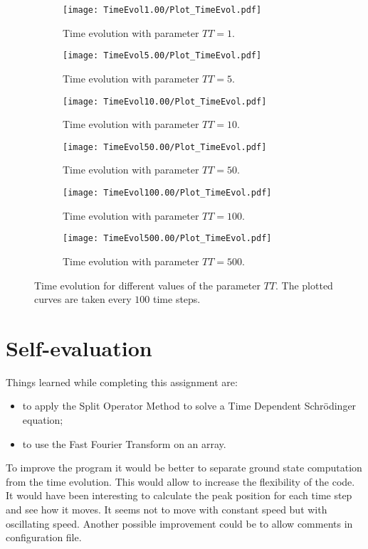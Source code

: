 \documentclass[11pt,a4paper]{article}
\begin{document}
\begin{figure}[t]
	\centering
	\begin{subfigure}{0.49\textwidth}
		\texttt{[image: TimeEvol1.00/Plot\_TimeEvol.pdf]}
		\caption{Time evolution with parameter $TT = 1$.}
		\label{fig:TE1}
	\end{subfigure}
	\hfill
	\begin{subfigure}{0.49\textwidth}
		\texttt{[image: TimeEvol5.00/Plot\_TimeEvol.pdf]}
		\caption{Time evolution with parameter $TT = 5$.}
		\label{fig:TE5}
	\end{subfigure}
	\begin{subfigure}{0.49\textwidth}
		\texttt{[image: TimeEvol10.00/Plot\_TimeEvol.pdf]}
		\caption{Time evolution with parameter $TT = 10$.}
		\label{fig:TE10}
	\end{subfigure}
	\hfill
	\begin{subfigure}{0.49\textwidth}
		\texttt{[image: TimeEvol50.00/Plot\_TimeEvol.pdf]}
		\caption{Time evolution with parameter $TT = 50$.}
		\label{fig:TE50}
	\end{subfigure}
	\begin{subfigure}{0.49\textwidth}
		\texttt{[image: TimeEvol100.00/Plot\_TimeEvol.pdf]}
		\caption{Time evolution with parameter $TT = 100$.}
		\label{fig:TE100}
	\end{subfigure}
	\hfill
	\begin{subfigure}{0.49\textwidth}
		\texttt{[image: TimeEvol500.00/Plot\_TimeEvol.pdf]}
		\caption{Time evolution with parameter $TT = 500$.}
		\label{fig:TE500}
	\end{subfigure}
	\caption{Time evolution for different values of the parameter $TT$. The plotted curves are taken every $100$ time steps.}
	\label{fig:TimeEvol}
\end{figure}

\section{Self-evaluation} %

Things learned while completing this assignment are:
\begin{itemize}
	\item to apply the Split Operator Method to solve a Time Dependent Schr\"odinger equation;
	\item to use the Fast Fourier Transform on an array.
\end{itemize}

To improve the program it would be better to separate ground state computation from the time evolution. This would allow to increase the flexibility of the code.
It would have been interesting to calculate the peak position for each time step and see how it moves. It seems not to move with constant speed but with oscillating speed.
Another possible improvement could be to allow comments in configuration file.
	
\end{document}
